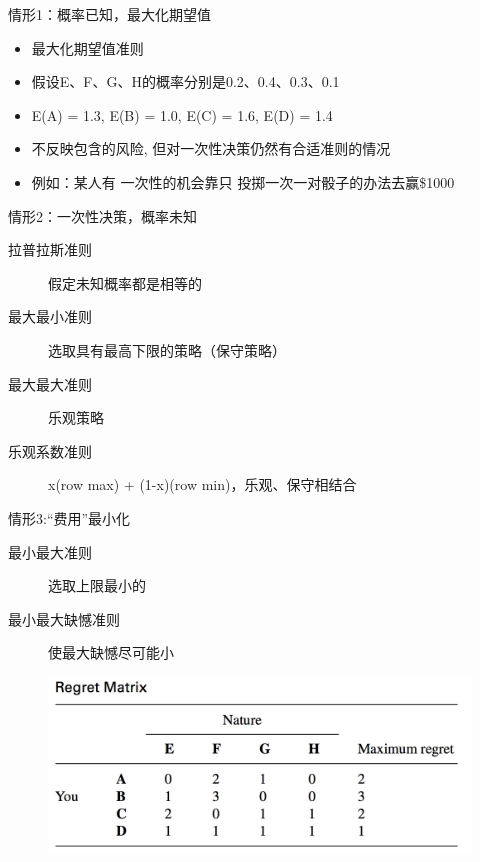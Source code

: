 \documentclass[mathserif, table]{beamer}
\begin{document}
\begin{frame}{情形1：概率已知，最大化期望值}
  \begin{itemize}
  \item<1-> 最大化期望值准则
  \item<1-> 假设E、F、G、H的概率分别是0.2、0.4、0.3、0.1
  \item<2-> E(A) = 1.3, E(B) = 1.0, {\color{red} E(C) = 1.6}, E(D) = 1.4
  \item<3-> 不反映包含的风险, 但对一次性决策仍然有合适准则的情况
  \item<4-> 例如：某人有{\color{red} 一次性}的机会靠只{\color{red} 投掷一次}一对骰子的办法去赢\$1000
  \end{itemize}
  
\end{frame}

\begin{frame}{情形2：一次性决策，概率未知}

  \begin{description}
  \item[拉普拉斯准则] 假定未知概率都是相等的
  \item[最大最小准则] 选取具有最高下限的策略（保守策略）
  \item[最大最大准则] 乐观策略
  \item[乐观系数准则] x(row max) + (1-x)(row min)，乐观、保守相结合
  \end{description}
  
\end{frame}

\begin{frame}{情形3:“费用”最小化}

  \begin{description}
  \item[最小最大准则] 选取上限最小的
  \item[最小最大缺憾准则] 使最大缺憾尽可能小
  \end{description}
  
  \begin{figure}
    \includegraphics[width=0.8\textwidth{}]{regret.png}
  \end{figure}

\end{frame}
\end{document}
